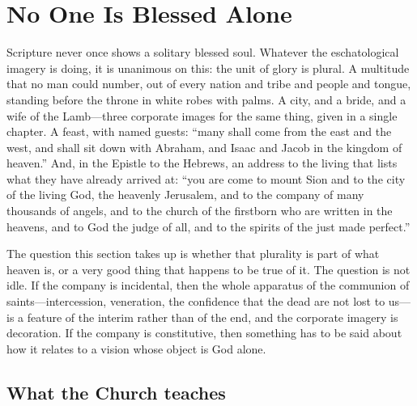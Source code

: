 \section{No One Is Blessed Alone}

Scripture never once shows a solitary blessed soul. Whatever the eschatological imagery is doing, it is unanimous on this: the unit of glory is plural. A multitude that no man could number, out of every nation and tribe and people and tongue, standing before the throne in white robes with palms. A city, and a bride, and a wife of the Lamb---three corporate images for the same thing, given in a single chapter. A feast, with named guests: ``many shall come from the east and the west, and shall sit down with Abraham, and Isaac and Jacob in the kingdom of heaven.'' And, in the Epistle to the Hebrews, an address to the living that lists what they have already arrived at: ``you are come to mount Sion and to the city of the living God, the heavenly Jerusalem, and to the company of many thousands of angels, and to the church of the firstborn who are written in the heavens, and to God the judge of all, and to the spirits of the just made perfect.''

The question this section takes up is whether that plurality is part of what heaven is, or a very good thing that happens to be true of it. The question is not idle. If the company is incidental, then the whole apparatus of the communion of saints---intercession, veneration, the confidence that the dead are not lost to us---is a feature of the interim rather than of the end, and the corporate imagery is decoration. If the company is constitutive, then something has to be said about how it relates to a vision whose object is God alone.

\subsection{What the Church teaches}

